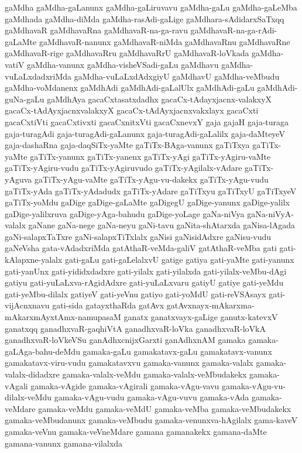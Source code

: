 {gaMdha
gaMdha-gaLanunx
gaMdha-gaLiruvavu
gaMdha-gaLu
gaMdha-gaLeMba
gaMdhada
gaMdha-diMda
gaMdha-rasAdi-gaLige
gaMdhara-sAdidarxSaTxqq
gaMdhavaR
gaMdhavaRna
gaMdhavaR-na-ga-ravu
gaMdhavaR-na-ga-rAdi-gaLaMte
gaMdhavaR-nanunx
gaMdhavaR-niMda
gaMdhavaRnu
gaMdhavaRne
gaMdhavaR-rige
gaMdhavaRru
gaMdhavaRrU
gaMdhavaR-loVkada
gaMdha-vatiV
gaMdha-vanunx
gaMdha-visheVSadi-gaLu
gaMdhavu
gaMdha-vuLaLxdadxriMda
gaMdha-vuLaLxdAdxgiyU
gaMdhavU
gaMdha-veMbudu
gaMdha-voMdanenx
gaMdhAdi
gaMdhAdi-gaLalUlx
gaMdhAdi-gaLu
gaMdhAdi-guNa-gaLu
gaMdhAya
gacaCxtasatxdadhx
gacaCx-tAdayxjacnx-valakxyX
gacaCx-tAdAyxjacnxvalakxyX
gacaCx-tAdAyxjacnxvakxlayx
gacaCxti
gacaCxtiVti
gacaCxtivxti
gacaCxnitxVti
gacaCxnevxY
gaja
gajaH
gaja-turaga
gaja-turagAdi
gaja-turagAdi-gaLanunx
gaja-turagAdi-gaLalilx
gaja-daMteyeV
gaja-dashaRna
gaja-daqSiTx-yaMte
gaTiTx-BAga-vanunx
gaTiTxya
gaTiTx-yaMte
gaTiTx-yanunx
gaTiTx-yanenx
gaTiTx-yAgi
gaTiTx-yAgiru-vaMte
gaTiTx-yAgiru-vudu
gaTiTx-yAgiruvudo
gaTiTx-yAgilalx-vAdare
gaTiTx-yAguva
gaTiTx-yAgu-vaMte
gaTiTx-yAgu-vu-dakekx
gaTiTx-yAgu-vudu
gaTiTx-yAda
gaTiTx-yAdadudx
gaTiTx-yAdare
gaTiTxyu
gaTiTxyU
gaTiTxyeV
gaTiTx-yoMdu
gaDige
gaDige-gaLaMte
gaDigegU
gaDige-yanunx
gaDige-yalilx
gaDige-yalilxruva
gaDige-yAga-bahudu
gaDige-yoLage
gaNa-niVya
gaNa-niVyA-valalx
gaNane
gaNa-nege
gaNa-neyu
gaNi-tavu
gaNita-shAtarxda
gaNisa-lAgada
gaNi-salapxTaTxre
gaNi-salapxTiTxlalx
gaNisi
gaNisidAdxre
gaNisu-vudu
gaNeVsha
gata-vAdadxriMda
gatAthaR-veMda-galiV
gatAthaR-veMba
gati
gati-kAlapxne-yalalx
gati-gaLu
gati-gaLelalxvU
gatige
gatiya
gati-yaMte
gati-yanunx
gati-yanUnx
gati-yididxdadxre
gati-yilalx
gati-yilalxda
gati-yilalx-veMbu-dAgi
gatiyu
gati-yuLaLxva-rAgidAdxre
gati-yuLaLxvaru
gatiyU
gatiye
gati-yeMdu
gati-yeMbu-dilalx
gatiyeV
gati-yeVnu
gatiyo
gati-yoMdU
gati-reVSAsayx
gati-vijAcnxnavu
gati-sida
gatayxthaRda
gatAvx
gatAvxnayx-mAkarxma-mAkarxmAyxtAmx-namupasaM
ganatx
ganatxvayx-gaLige
ganutx-katevxV
ganatxqq
ganadhxvaR-gaqhiVtA
ganadhxvaR-loVka
ganadhxvaR-loVkA
ganadhxvaR-loVkeVSu
ganAdhxcnijxGarxti
ganAdhxnAM
gamaka
gamaka-gaLAga-bahu-deMdu
gamaka-gaLu
gamakatavx-gaLu
gamakatavx-vanunx
gamakatavx-viru-vudu
gamakatavxvu
gamaka-vanunx
gamaka-valalx
gamaka-valalx-didadxre
gamaka-valalx-veMdu
gamaka-valalx-veMbudakekx
gamaka-vAgali
gamaka-vAgide
gamaka-vAgirali
gamaka-vAgu-vavu
gamaka-vAgu-vu-dilalx-veMdu
gamaka-vAgu-vudu
gamaka-vAgu-vuvu
gamaka-vAda
gamaka-veMdare
gamaka-veMdu
gamaka-veMdU
gamaka-veMba
gamaka-veMbudakekx
gamaka-veMbudanunx
gamaka-veMbudu
gamaka-venunxva-hAgilalx
gama-kaveV
gamaka-veVnu
gamaka-veVneMdare
gamana
gamanakekx
gamana-daMte
gamana-vanunx
gamana-vilalxda
}
